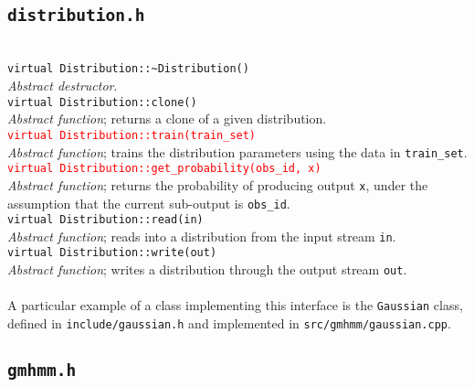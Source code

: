 \documentclass[12pt]{article}
\newcommand{\fundef}[1]{\\\indent\indent\texttt{#1}\\}
\begin{document}
	\subsection{\tt distribution.h}\label{sec:disthdr}
	\hfill\vspace*{-10pt}\fundef{virtual Distribution::\textasciitilde Distribution()}
	\emph{Abstract destructor}.
	\fundef{virtual Distribution::clone()}
	\emph{Abstract function}; returns a clone of a given distribution.
	\textcolor{red}{\fundef{virtual Distribution::train(train\_set)}}
	\emph{Abstract function}; trains the distribution parameters using the data in {\tt train\_set}.
	\textcolor{red}{\fundef{virtual Distribution::get\_probability(obs\_id, x)}}
	\emph{Abstract function}; returns the probability of producing output {\tt x}, under the assumption that the current sub-output is {\tt obs\_id}.
	\fundef{virtual Distribution::read(in)}
	\emph{Abstract function}; reads into a distribution from the input stream {\tt in}.
	\fundef{virtual Distribution::write(out)}
	\emph{Abstract function}; writes a distribution through the output stream {\tt out}.\\ \\
	A particular example of a class implementing this interface is the {\tt Gaussian} class, defined in {\tt include/gaussian.h} and implemented in {\tt src/gmhmm/gaussian.cpp}.
	
	\subsection{\tt gmhmm.h}
	
\end{document}
